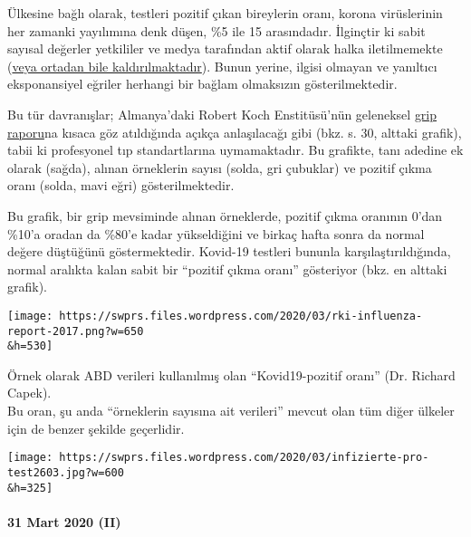 Ülkesine bağlı olarak, testleri pozitif çıkan bireylerin oranı, korona
virüslerinin her zamanki yayılımına denk düşen, \%5 ile 15 arasındadır.
İlginçtir ki sabit sayısal değerler yetkililer ve medya tarafından aktif
olarak halka iletilmemekte
(\href{https://multipolar-magazin.de/artikel/coronavirus-irrefuhrung-fallzahlen}{veya
ortadan bile kaldırılmaktadır}). Bunun yerine, ilgisi olmayan ve
yanıltıcı eksponansiyel eğriler herhangi bir bağlam olmaksızın
gösterilmektedir.

Bu tür davranışlar; Almanya'daki Robert Koch Enstitüsü'nün geleneksel
\href{https://influenza.rki.de/Saisonberichte/2017.pdf}{grip raporu}na
kısaca göz atıldığında açıkça anlaşılacağı gibi (bkz. s. 30, alttaki
grafik), tabii ki profesyonel tıp standartlarına uymamaktadır. Bu
grafikte, tanı adedine ek olarak (sağda), alınan örneklerin sayısı
(solda, gri çubuklar) ve pozitif çıkma oranı (solda, mavi eğri)
gösterilmektedir.

Bu grafik, bir grip mevsiminde alınan örneklerde, pozitif çıkma oranının
0'dan \%10'a oradan da \%80'e kadar yükseldiğini ve birkaç hafta sonra
da normal değere düştüğünü göstermektedir. Kovid-19 testleri bununla
karşılaştırıldığında, normal aralıkta kalan sabit bir ``pozitif çıkma
oranı'' gösteriyor (bkz. en alttaki grafik).

\texttt{[image: https://swprs.files.wordpress.com/2020/03/rki-influenza-report-2017.png?w=650\\\&h=530]}

Örnek olarak ABD verileri kullanılmış olan ``Kovid19-pozitif oranı''
(Dr. Richard Capek).\\
Bu oran, şu anda ``örneklerin sayısına ait verileri'' mevcut olan tüm
diğer ülkeler için de benzer şekilde geçerlidir.

\texttt{[image: https://swprs.files.wordpress.com/2020/03/infizierte-pro-test2603.jpg?w=600\\\&h=325]}

\hypertarget{31-mart-2020-ii}{%
\paragraph{31 Mart 2020 (II)}\label{31-mart-2020-ii}}

